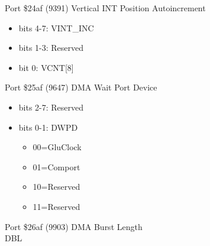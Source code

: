Port \$24af (9391) Vertical INT Position Autoincrement
\begin{itemize}
\item[] bits 4-7: VINT\_INC
\item[] bits 1-3: Reserved
\item[] bit 0: VCNT[8]
\end{itemize}

Port \$25af (9647) DMA Wait Port Device
\begin{itemize}
\item[] bits 2-7: Reserved
\item[] bits 0-1: DWPD
  \begin{itemize}
  \item[] 00=GluClock
  \item[] 01=Comport
  \item[] 10=Reserved
  \item[] 11=Reserved
\end{itemize}
\end{itemize}

Port \$26af (9903) DMA Burst Length\\
DBL

